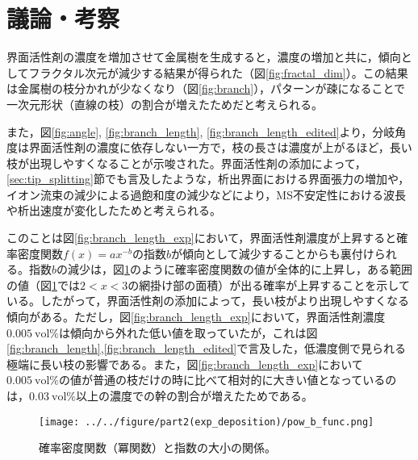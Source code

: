 \documentclass[autodetect-engine,dvi=dvipdfmx,a4paper,ja=standard,oneside,openany,11pt]{bxjsbook}
\begin{document}
\section{議論・考察}
界面活性剤の濃度を増加させて金属樹を生成すると，濃度の増加と共に，傾向としてフラクタル次元が減少する結果が得られた（図\ref{fig:fractal_dim}）。この結果は金属樹の枝分かれが少なくなり（図\ref{fig:branch}），パターンが疎になることで一次元形状（直線の枝）の割合が増えたためだと考えられる。

また，図\ref{fig:angle}, \ref{fig:branch_length}, \ref{fig:branch_length_edited}より，分岐角度は界面活性剤の濃度に依存しない一方で，枝の長さは濃度が上がるほど，長い枝が出現しやすくなることが示唆された。界面活性剤の添加によって，\ref{sec:tip_splitting}節でも言及したような，析出界面における界面張力の増加や，イオン流束の減少による過飽和度の減少などにより，MS不安定性における波長や析出速度が変化したためと考えられる。

このことは図\ref{fig:branch_length_exp}において，界面活性剤濃度が上昇すると確率密度関数$f(x)=ax^{-b}$の指数$b$が傾向として減少することからも裏付けられる。指数$b$の減少は，図\ref{fig:pow_b_func}のように確率密度関数の値が全体的に上昇し，ある範囲の値（図\ref{fig:pow_b_func}では$2<x<3$の網掛け部の面積）が出る確率が上昇することを示している。したがって，界面活性剤の添加によって，長い枝がより出現しやすくなる傾向がある。ただし，図\ref{fig:branch_length_exp}において，界面活性剤濃度$\SI{0.005}{\mathrm{vol}\%}$は傾向から外れた低い値を取っていたが，これは図\ref{fig:branch_length},\ref{fig:branch_length_edited}で言及した，低濃度側で見られる極端に長い枝の影響である。また，図\ref{fig:branch_length_exp}において$\SI{0.005}{\mathrm{vol}\%}$の値が普通の枝だけの時に比べて相対的に大きい値となっているのは，$\SI{0.03}{\mathrm{vol}\%}$以上の濃度での幹の割合が増えたためである。

\begin{figure}[htbp]
  \centering
  \texttt{[image: ../../figure/part2(exp\_deposition)/pow\_b\_func.png]}
  \caption{確率密度関数（冪関数）と指数の大小の関係。}
  \label{fig:pow_b_func}
\end{figure}

\ifdraft{
  
  
}{}
\end{document}
